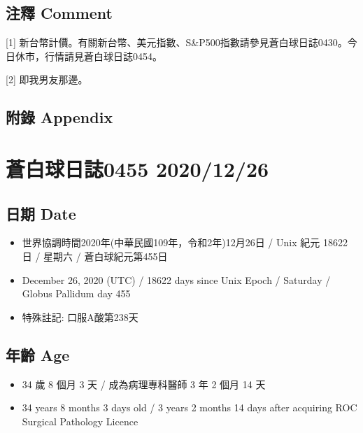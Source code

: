 \documentclass[a5paper, 10pt
]{book}
\providecommand{\tightlist}{%
  \setlength{\itemsep}{0pt}\setlength{\parskip}{0pt}}
\begin{document}
\hypertarget{ux6ce8ux91cb-comment-24}{%
\subsection{注釋 Comment}\label{ux6ce8ux91cb-comment-24}}

{[}1{]}
新台幣計價。有關新台幣、美元指數、S\&P500指數請參見蒼白球日誌0430。今日休市，行情請見蒼白球日誌0454。

{[}2{]} 即我男友那邊。

\hypertarget{ux9644ux9304-appendix-24}{%
\subsection{附錄 Appendix}\label{ux9644ux9304-appendix-24}}

\hypertarget{ux84bcux767dux7403ux65e5ux8a8c0455-20201226}{%
\section{蒼白球日誌0455
2020/12/26}\label{ux84bcux767dux7403ux65e5ux8a8c0455-20201226}}

\hypertarget{ux65e5ux671f-date-25}{%
\subsection{日期 Date}\label{ux65e5ux671f-date-25}}

\begin{itemize}
\tightlist
\item
  世界協調時間2020年(中華民國109年，令和2年)12月26日 / Unix 紀元 18622
  日 / 星期六 / 蒼白球紀元第455日
\item
  December 26, 2020 (UTC) / 18622 days since Unix Epoch / Saturday /
  Globus Pallidum day 455
\item
  特殊註記: 口服A酸第238天
\end{itemize}

\hypertarget{ux5e74ux9f61-age-25}{%
\subsection{年齡 Age}\label{ux5e74ux9f61-age-25}}

\begin{itemize}
\tightlist
\item
  34 歲 8 個月 3 天 / 成為病理專科醫師 3 年 2 個月 14 天
\item
  34 years 8 months 3 days old / 3 years 2 months 14 days after
  acquiring ROC Surgical Pathology Licence
\end{itemize}
\end{document}
